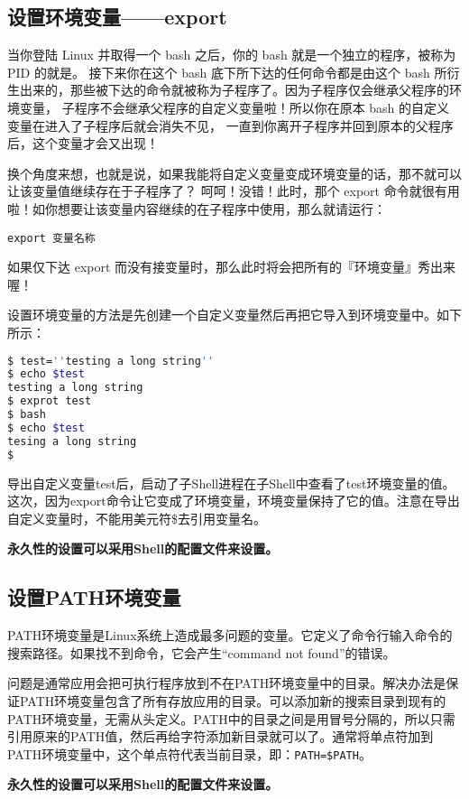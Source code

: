 \subsection{设置环境变量——export}
当你登陆 Linux 并取得一个 bash 之后，你的 bash 就是一个独立的程序，被称为 PID 的就是。 接下来你在这个 bash 底下所下达的任何命令都是由这个 bash 所衍生出来的，那些被下达的命令就被称为子程序了。因为子程序仅会继承父程序的环境变量， 子程序不会继承父程序的自定义变量啦！所以你在原本 bash 的自定义变量在进入了子程序后就会消失不见， 一直到你离开子程序并回到原本的父程序后，这个变量才会又出现！

换个角度来想，也就是说，如果我能将自定义变量变成环境变量的话，那不就可以让该变量值继续存在于子程序了？ 呵呵！没错！此时，那个 export 命令就很有用啦！如你想要让该变量内容继续的在子程序中使用，那么就请运行：

\verb|export 变量名称|

 如果仅下达 export 而没有接变量时，那么此时将会把所有的『环境变量』秀出来喔！

设置环境变量的方法是先创建一个自定义变量然后再把它导入到环境变量中。如下所示：
\begin{lstlisting}[language=sh]
$ test=''testing a long string''
$ echo $test
testing a long string
$ exprot test
$ bash
$ echo $test
tesing a long string
$
\end{lstlisting}

导出自定义变量test后，启动了子Shell进程在子Shell中查看了test环境变量的值。这次，因为export命令让它变成了环境变量，环境变量保持了它的值。注意在导出自定义变量时，不能用美元符\$去引用变量名。

\textbf{永久性的设置可以采用Shell的配置文件来设置。}




\subsection{设置PATH环境变量}
PATH环境变量是Linux系统上造成最多问题的变量。它定义了命令行输入命令的搜索路径。如果找不到命令，它会产生“command not found”的错误。

问题是通常应用会把可执行程序放到不在PATH环境变量中的目录。解决办法是保证PATH环境变量包含了所有存放应用的目录。可以添加新的搜索目录到现有的PATH环境变量，无需从头定义。PATH中的目录之间是用冒号分隔的，所以只需引用原来的PATH值，然后再给字符添加新目录就可以了。通常将单点符加到PATH环境变量中，这个单点符代表当前目录，即：\verb|PATH=$PATH|。

\textbf{永久性的设置可以采用Shell的配置文件来设置。}



